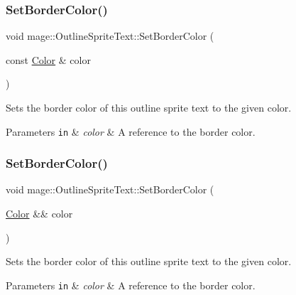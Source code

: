 \subsubsection{\texorpdfstring{Set\+Border\+Color()}{SetBorderColor()}\hspace{0.1cm}{\footnotesize\ttfamily [1/3]}}
{\footnotesize\ttfamily void mage\+::\+Outline\+Sprite\+Text\+::\+Set\+Border\+Color (\begin{DoxyParamCaption}\item[{const \hyperlink{structmage_1_1_color}{Color} \&}]{color }\end{DoxyParamCaption})\hspace{0.3cm}{\ttfamily [noexcept]}}

Sets the border color of this outline sprite text to the given color.


\begin{DoxyParams}[1]{Parameters}
\mbox{\tt in}  & {\em color} & A reference to the border color. \\
\hline
\end{DoxyParams}
\hypertarget{classmage_1_1_outline_sprite_text_a7bd6e4fc0afefb65ca9d543f52941400}{}\label{classmage_1_1_outline_sprite_text_a7bd6e4fc0afefb65ca9d543f52941400} 
\subsubsection{\texorpdfstring{Set\+Border\+Color()}{SetBorderColor()}\hspace{0.1cm}{\footnotesize\ttfamily [2/3]}}
{\footnotesize\ttfamily void mage\+::\+Outline\+Sprite\+Text\+::\+Set\+Border\+Color (\begin{DoxyParamCaption}\item[{\hyperlink{structmage_1_1_color}{Color} \&\&}]{color }\end{DoxyParamCaption})\hspace{0.3cm}{\ttfamily [noexcept]}}

Sets the border color of this outline sprite text to the given color.


\begin{DoxyParams}[1]{Parameters}
\mbox{\tt in}  & {\em color} & A reference to the border color. \\
\hline
\end{DoxyParams}
\hypertarget{classmage_1_1_outline_sprite_text_a861b01bf303caf0c08a599f3d4a77894}{}\label{classmage_1_1_outline_sprite_text_a861b01bf303caf0c08a599f3d4a77894} 
